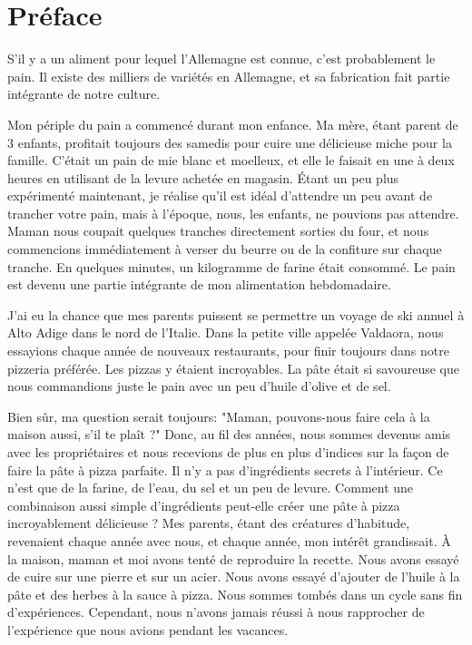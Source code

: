 \chapter{Préface}%
\label{ch:Preface}

S'il y a un aliment pour lequel l'Allemagne est connue, c'est probablement le pain.
Il existe des milliers de variétés en Allemagne,
et sa fabrication fait partie intégrante de notre culture.

Mon périple du pain a commencé durant mon enfance. Ma mère, étant parent
de 3 enfants, profitait toujours des samedis pour cuire une délicieuse miche pour la famille.
C'était un pain de mie blanc et moelleux, et elle le faisait en une à deux heures en utilisant de la levure achetée en magasin.
Étant un peu plus expérimenté maintenant, je réalise qu'il est
idéal d'attendre un peu avant de trancher votre pain, mais à l'époque,
nous, les enfants, ne pouvions pas attendre. Maman nous coupait quelques tranches directement sorties du four, et nous commencions immédiatement
à verser du beurre ou de la confiture sur chaque tranche. En quelques minutes,
un kilogramme de farine était consommé. Le pain est devenu une partie intégrante de mon
alimentation hebdomadaire.

J'ai eu la chance que mes parents puissent se permettre un voyage de ski annuel à
Alto Adige dans le nord de l'Italie. Dans la petite ville appelée Valdaora, nous
essayions chaque année de nouveaux restaurants, pour finir toujours dans notre pizzeria
préférée. Les pizzas y étaient incroyables. La pâte
était si savoureuse que nous commandions juste le pain avec un
peu d'huile d'olive et de sel.

Bien sûr, ma question serait toujours: "Maman, pouvons-nous faire cela à la maison aussi, s'il te plaît ?"
Donc, au fil des années, nous sommes devenus amis avec les propriétaires et nous recevions
de plus en plus d'indices sur la façon de faire la pâte à pizza parfaite. Il
n'y a pas d'ingrédients secrets à l'intérieur. Ce n'est que de la farine, de l'eau, du sel et un peu de levure.
Comment une combinaison aussi simple d'ingrédients peut-elle créer une pâte à pizza
incroyablement délicieuse ? Mes parents, étant des créatures d'habitude, revenaient chaque année avec nous,
et chaque année, mon intérêt grandissait. À la maison, maman et moi avons tenté de reproduire
la recette. Nous avons essayé de cuire sur une pierre et sur un acier. Nous avons essayé d'ajouter de l'huile à la pâte et des herbes
à la sauce à pizza. Nous sommes tombés dans un cycle sans fin d'expériences. Cependant, nous n'avons jamais réussi
à nous rapprocher de l'expérience que nous avions pendant les vacances.

